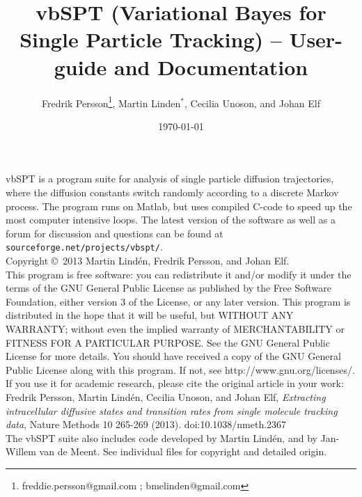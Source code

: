 \documentclass[11pt,a4paper]{article}
\title{vbSPT (Variational Bayes for Single Particle Tracking) -- User-guide and Documentation}
\author{Fredrik Persson\footnote{freddie.persson@gmail.com ; bmelinden@gmail.com},
Martin Linden$^*$, Cecilia Unoson, and Johan Elf}
\date{\today}
\begin{document}
\maketitle 

\noindent vbSPT is a program suite for analysis of single particle diffusion
trajectories, where the diffusion constants switch randomly according
to a discrete Markov process. The program runs on Matlab, but uses
compiled C-code to speed up the most computer intensive loops.  The
latest version of the software as well as a forum for discussion and
questions can be found at \verb+sourceforge.net/projects/vbspt/+.\medskip\\

\noindent Copyright \copyright \  2013 Martin Lind\'en, Fredrik Persson, and
Johan Elf.\medskip\\
 
\noindent This program is free software: you can redistribute it
and/or modify it under the terms of the GNU General Public License as
published by the Free Software Foundation, either version 3 of the
License, or any later version.  This program is distributed in the
hope that it will be useful, but WITHOUT ANY WARRANTY; without even
the implied warranty of MERCHANTABILITY or FITNESS FOR A PARTICULAR
PURPOSE. See the GNU General Public License for more details. You
should have received a copy of the GNU General Public License along
with this program. If not, see http://www.gnu.org/licenses/.\medskip\\

\noindent If you use it for academic research, please cite the
original article in your work:\medskip\\
\noindent Fredrik Persson, Martin Lind\'en, Cecilia Unoson, and Johan
Elf, \emph{Extracting intracellular diffusive states and transition
  rates from single molecule tracking data}, Nature Methods 10 265-269
(2013). doi:10.1038/nmeth.2367 \medskip\\

\noindent The vbSPT suite also includes code developed by Martin
Lind\'en, and by Jan-Willem van de Meent. See individual files for
copyright and detailed origin.
\end{document}
